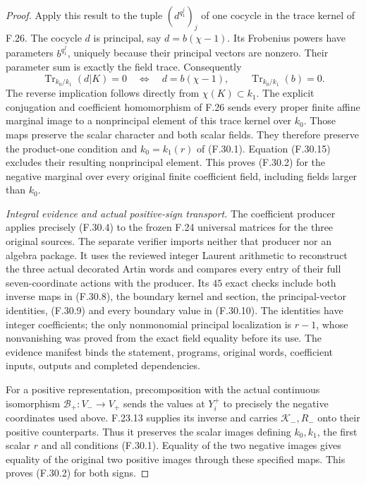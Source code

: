 \begin{proof}
Apply this result to the tuple
$(d^{q_1^j})_j$ of one cocycle in the trace
kernel of F.26. The cocycle $d$ is principal,
say $d=b(\chi-1)$.
Its Frobenius powers have parameters
$b^{q_1^j}$, uniquely because their principal
vectors are nonzero. Their parameter sum
is exactly the field trace. Consequently
\[
 \operatorname{Tr}_{k_0/k_1}(d|K)=0
 \quad\Longleftrightarrow\quad
 d=b(\chi-1),\qquad \operatorname{Tr}_{k_0/k_1}(b)=0.
                                                               \tag{F.30.15}
\]
The reverse implication follows directly from
$\chi(K)\subset k_1$.
The explicit conjugation and coefficient
homomorphism of F.26 sends every proper
finite affine marginal image to a nonprincipal
element of this trace kernel over $k_0$.
Those maps preserve the scalar character
and both scalar fields. They therefore
preserve the product-one condition and
$k_0=k_1(r)$ of (F.30.1).
Equation (F.30.15) excludes their resulting
nonprincipal element. This proves (F.30.2)
for the negative marginal over every original
finite coefficient field, including fields
larger than $k_0$.

\emph{Integral evidence and actual positive-sign transport.}
The coefficient producer applies precisely
(F.30.4) to the frozen F.24 universal matrices
for the three original sources.
The separate verifier imports neither that
producer nor an algebra package. It uses the
reviewed integer Laurent arithmetic to
reconstruct the three actual decorated Artin
words and compares every entry of their full
seven-coordinate actions with the producer.
Its $45$ exact checks include both inverse
maps in (F.30.8), the boundary kernel and
section, the principal-vector identities,
(F.30.9) and every boundary value in (F.30.10).
The identities have integer coefficients;
the only nonmonomial principal localization
is $r-1$, whose nonvanishing was proved from
the exact field equality before its use.
The evidence manifest binds the statement,
programs, original words, coefficient inputs,
outputs and completed dependencies.

For a positive representation, precomposition
with the actual continuous isomorphism
$\mathcal B_+:V_-\to V_+$ sends the values
at $Y_i^+$ to precisely the negative
coordinates used above.
F.23.13 supplies its inverse and carries
$\mathcal K_-,R_-$ onto their positive
counterparts. Thus it preserves the scalar
images defining $k_0,k_1$, the first scalar
$r$ and all conditions (F.30.1).
Equality of the two negative images gives
equality of the original two positive images
through these specified maps. This proves
(F.30.2) for both signs.
\end{proof}

